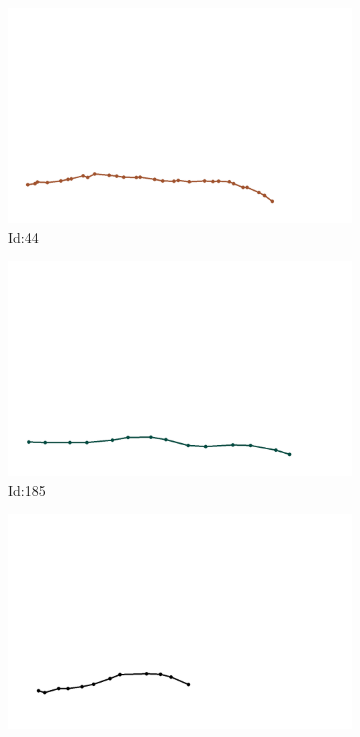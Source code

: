 \documentclass[12pt,twoside]{report}
\begin{document}
\begin{figure}
\centering
\begin{subfigure}[b]{0.20\textwidth}
\centering
\includegraphics[width=\textwidth]{../trajectories/44.png}
\caption{Id:44}
\end{subfigure}
\begin{subfigure}[b]{0.20\textwidth}
\centering
\includegraphics[width=\textwidth]{../trajectories/185.png}
\caption{Id:185}
\end{subfigure}
\begin{subfigure}[b]{0.20\textwidth}
\centering
\includegraphics[width=\textwidth]{../trajectories/189.png}

\end{subfigure}
\end{figure}
\end{document}
